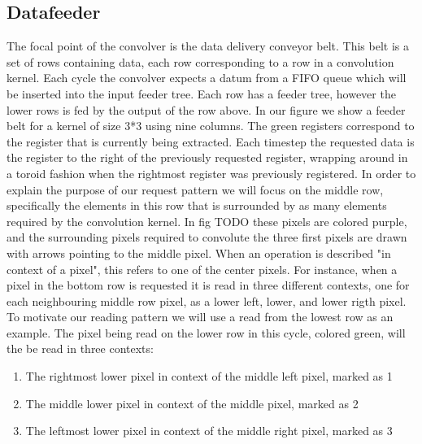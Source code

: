 \subsection{Datafeeder}
The focal point of the convolver is the data delivery conveyor belt. This belt is a set of rows containing data, each row corresponding to a row in a convolution kernel.
Each cycle the convolver expects a datum from a FIFO queue which will be inserted into the input feeder tree. Each row has a feeder tree, however the lower rows is fed by the output of the row above.
In our figure we show a feeder belt for a kernel of size 3*3 using nine columns. The green registers correspond to the register that is currently being extracted.
Each timestep the requested data is the register to the right of the previously requested register, wrapping around in a toroid fashion when the rightmost register was previously registered.
In order to explain the purpose of our request pattern we will focus on the middle row, specifically the elements in this row that is surrounded by as many elements required by the convolution kernel.
In fig TODO these pixels are colored purple, and the surrounding pixels required to convolute the three first pixels are drawn with arrows pointing to the middle pixel.
When an operation is described "in context of a pixel", this refers to one of the center pixels. 
For instance, when a pixel in the bottom row is requested it is read in three different contexts, one for each neighbouring middle row pixel, as a lower left, lower, and lower rigth pixel.
To motivate our reading pattern we will use a read from the lowest row as an example. The pixel being read on the lower row in this cycle, colored green, will the be read in three contexts:
\begin{enumerate}
    \item The rightmost lower pixel in context of the middle left pixel, marked as 1
    \item The middle lower pixel in context of the middle pixel, marked as 2
    \item The leftmost lower pixel in context of the middle right pixel, marked as 3
\end{enumerate}

